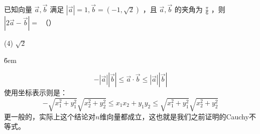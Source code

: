 \begin{example}
    已知向量 $\overrightarrow{a}, \overrightarrow{b}$ 满足 $|\overrightarrow{a}|=1, \overrightarrow{b}=(-1, \sqrt{2})$ ，且 $\overrightarrow{a}, \overrightarrow{b}$ 的夹角为 $\frac{\pi}{6}$ ，则 $|2 \overrightarrow{a}-\overrightarrow{b}|=$ （\qquad）
    \begin{tasks}(4)
        \task $\sqrt{2}$
    \end{tasks}
\end{example}

\v{6em}

\begin{theorem}[Cauchy不等式]
    $$
        -|\overrightarrow{a}||\overrightarrow{b}| \le \overrightarrow{a} \cdot \overrightarrow{b} \le |\overrightarrow{a}||\overrightarrow{b}|
    $$
    使用坐标表示则是：
    $$
        -\sqrt{x_1^2+y_1^2}\sqrt{x_2^2+y_2^2} \le x_1x_2 + y_1y_2 \le \sqrt{x_1^2+y_1^2}\sqrt{x_2^2+y_2^2}
    $$
    更一般的，实际上这个结论对$n$维向量都成立，这也就是我们之前证明的Cauchy不等式。
\end{theorem}

